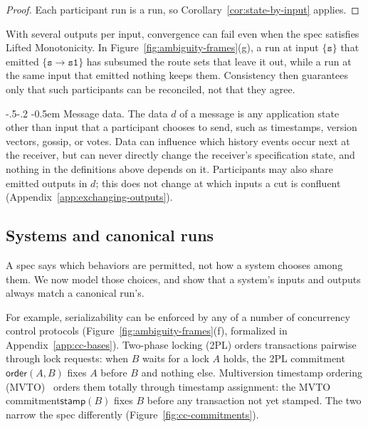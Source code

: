 \documentclass[sigconf]{cidr-2027}
\makeatletter
\theoremstyle{remark}
\renewcommand\paragraph{\@startsection{paragraph}{4}{\z@}%
  {-.5\baselineskip \@plus -2\p@ \@minus -.2\p@}%
  {-0.5em}%
  {\normalfont\bfseries}}
\newcommand{\commitment}{commitment\xspace}
\makeatother
\begin{document}
\begin{proof}
Each participant run is a run, so Corollary~\ref{cor:state-by-input} applies.
\end{proof}

With several outputs per input, convergence can fail even when the spec
satisfies Lifted Monotonicity. In Figure~\ref{fig:ambiguity-frames}(g), a run at input $\{\texttt{s}\}$ that emitted
$\{\texttt{s}{\to}\texttt{s1}\}$ has subsumed the route sets that leave it out, while a run at the same input that
emitted nothing keeps them. Consistency then guarantees only that such participants can be reconciled, not
that they agree.

\paragraph{Message data.}
The data $d$ of a message is any application state other than input that a
participant chooses to send, such as timestamps, version vectors, gossip, or votes. Data
can influence which history events occur next at the receiver, but can
never directly change the receiver's specification state, and nothing in the
definitions above depends on it. Participants may also share emitted outputs in $d$; this does not change
at which inputs a cut is confluent (Appendix~\ref{app:exchanging-outputs}).


\subsection{Systems and canonical runs}
\label{sec:systems}

\textcolor{reviewed}{A spec says which behaviors are permitted, not how a system chooses among them.} \textcolor{reviewed}{We now model those choices, and show that a system's inputs and outputs always
match a canonical run's.}

For example, serializability can be enforced by any of a number of concurrency
control protocols (Figure~\ref{fig:ambiguity-frames}(f), formalized in
Appendix~\ref{app:cc-bases}). \textcolor{reviewed}{Two-phase locking (2PL) orders transactions
pairwise through lock requests: when $B$ waits for a lock $A$ holds, the 2PL \commitment $\mathsf{order}(A,B)$ fixes $A$ before $B$ and nothing else.} \textcolor{reviewed}{Multiversion
timestamp ordering (MVTO)~\cite{bernstein1981concurrency} orders them totally
through timestamp assignment: the MVTO \commitment $\mathsf{stamp}(B)$ fixes $B$ before any
transaction not yet stamped.} The
two narrow the spec differently (Figure~\ref{fig:cc-commitments}).
\end{document}
